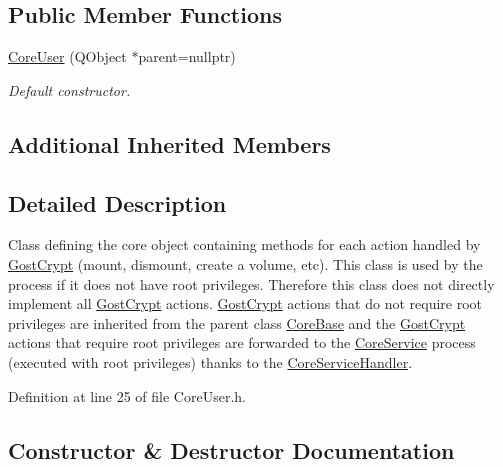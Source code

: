 \subsection*{Public Member Functions}
\begin{DoxyCompactItemize}
\item 
\hyperlink{class_gost_crypt_1_1_core_1_1_core_user_a9c1772217b9cf8c154c1b2dc6d4bb24b}{Core\+User} (Q\+Object $\ast$parent=nullptr)
\begin{DoxyCompactList}\small\item\em Default constructor. \end{DoxyCompactList}\end{DoxyCompactItemize}
\subsection*{Additional Inherited Members}


\subsection{Detailed Description}
Class defining the core object containing methods for each action handled by \hyperlink{namespace_gost_crypt}{Gost\+Crypt} (mount, dismount, create a volume, etc). This class is used by the process if it does not have root privileges. Therefore this class does not directly implement all \hyperlink{namespace_gost_crypt}{Gost\+Crypt} actions. \hyperlink{namespace_gost_crypt}{Gost\+Crypt} actions that do not require root privileges are inherited from the parent class \hyperlink{class_gost_crypt_1_1_core_1_1_core_base}{Core\+Base} and the \hyperlink{namespace_gost_crypt}{Gost\+Crypt} actions that require root privileges are forwarded to the \hyperlink{class_gost_crypt_1_1_core_1_1_core_service}{Core\+Service} process (executed with root privileges) thanks to the \hyperlink{class_gost_crypt_1_1_core_1_1_core_service_handler}{Core\+Service\+Handler}. 

Definition at line 25 of file Core\+User.\+h.



\subsection{Constructor \& Destructor Documentation}
\mbox{\label{class_gost_crypt_1_1_core_1_1_core_user_a9c1772217b9cf8c154c1b2dc6d4bb24b}} 
